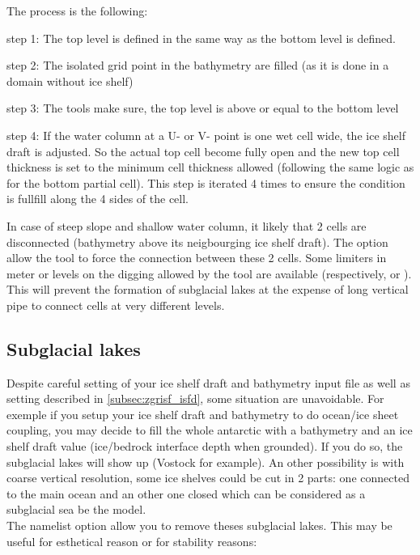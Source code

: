 \documentclass[../main/NEMO_manual]{subfiles}
\begin{document}
The process is the following:
\begin{description}
\item{step 1:} The top level is defined in the same way as the bottom level is defined.
\item{step 2:} The isolated grid point in the bathymetry are filled (as it is done in a domain without ice shelf)
\item{step 3:} The tools make sure, the top level is above or equal to the bottom level
\item{step 4:} If the water column at a U- or V- point is one wet cell wide, the ice shelf draft is adjusted. So the actual top cell become fully open and the new
  top cell thickness is set to the minimum cell thickness allowed (following the same logic as for the bottom partial cell). This step is iterated 4 times to ensure the condition is fullfill along the 4 sides of the cell.
\end{description}

In case of steep slope and shallow water column, it likely that 2 cells are disconnected (bathymetry above its neigbourging ice shelf draft). 
The option  allow the tool to force the connection between these 2 cells.
Some limiters in meter or levels on the digging allowed by the tool are available (respectively,  or ).
This will prevent the formation of subglacial lakes at the expense of long vertical pipe to connect cells at very different levels.

\subsection{Subglacial lakes}
Despite careful setting of your ice shelf draft and bathymetry input file as well as setting described in \autoref{subsec:zgrisf_isfd}, some situation are unavoidable.
For exemple if you setup your ice shelf draft and bathymetry to do ocean/ice sheet coupling, 
you may decide to fill the whole antarctic with a bathymetry and an ice shelf draft value (ice/bedrock interface depth when grounded). 
If you do so, the subglacial lakes will show up (Vostock for example). An other possibility is with coarse vertical resolution, some ice shelves could be cut in 2 parts: 
one connected to the main ocean and an other one closed which can be considered as a subglacial sea be the model.\\

The namelist option  allow you to remove theses subglacial lakes.
This may be useful for esthetical reason or for stability reasons:
\end{document}
